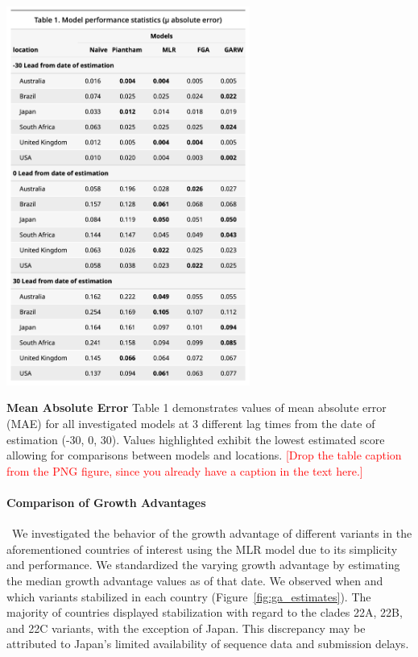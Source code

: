 \documentclass[11pt,oneside,letterpaper]{article}
\def\jhc#1{\textcolor{red}{[#1]}}
\begin{document}
\begin{table}[H]
	\centering
	\includegraphics[width=0.6\textwidth]{figures/model_comp_table.png}
	\caption{\textbf{Mean Absolute Error}
	Table 1 demonstrates values of mean absolute error (MAE) for all investigated models at 3 different lag times from the date of estimation (-30, 0, 30).
	Values highlighted exhibit the lowest estimated score allowing for comparisons between models and locations.
    \jhc{Drop the table caption from the PNG figure, since you already have a caption in the text here.}
	}
	\label{table:model_comp_table}
\end{table}

\paragraph{Comparison of Growth Advantages}\ We investigated the behavior of the growth advantage of different variants in the aforementioned countries of interest using the MLR model due to its simplicity and performance.
We standardized the varying growth advantage by estimating the median growth advantage values as of that date.
We observed when and which variants stabilized in each country (Figure~\ref{fig:ga_estimates}).
The majority of countries displayed stabilization with regard to the clades 22A, 22B, and 22C variants, with the exception of Japan.
This discrepancy may be attributed to Japan's limited availability of sequence data and submission delays.
\end{document}
